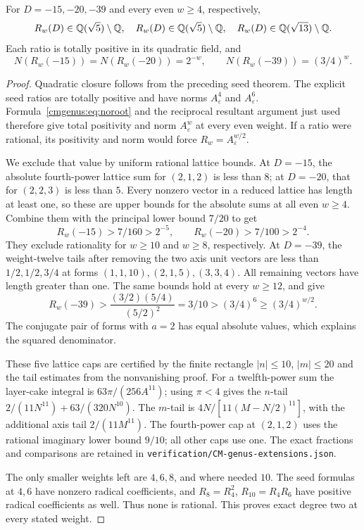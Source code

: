 \begin{theorem}
\label{cmextend:thm:exactdegree}
For $D=-15,-20,-39$ and every even $w\ge4$, respectively,
\[
 R_w(D)\in\mathbb{Q}(\sqrt5)\setminus\mathbb{Q},\quad
 R_w(D)\in\mathbb{Q}(\sqrt5)\setminus\mathbb{Q},\quad
 R_w(D)\in\mathbb{Q}(\sqrt{13})\setminus\mathbb{Q}.
\]
Each ratio is totally positive in its quadratic field, and
\[
 N(R_w(-15))=N(R_w(-20))=2^{-w},\qquad
 N(R_w(-39))=(3/4)^w.
\]
\end{theorem}
\begin{proof}
Quadratic closure follows from the preceding seed theorem. The explicit
seed ratios are totally positive and have norms $A_\varepsilon^4$ and
$A_\varepsilon^6$. Formula~\eqref{cmgenus:eq:noroot} and the reciprocal
resultant argument just used therefore give total positivity and norm
$A_\varepsilon^w$ at every even weight. If a ratio were rational, its
positivity and norm would force $R_w=A_\varepsilon^{w/2}$.

We exclude that value by uniform rational lattice bounds. At $D=-15$,
the absolute fourth-power lattice sum for $(2,1,2)$ is less than $8$;
at $D=-20$, that for $(2,2,3)$ is less than $5$. Every nonzero vector in
a reduced lattice has length at least one, so these are upper bounds for
the absolute sums at all even $w\ge4$. Combine them with the principal
lower bound $7/20$ to get
\[
 R_w(-15)>7/160>2^{-5},\qquad
 R_w(-20)>7/100>2^{-4}.
\]
They exclude rationality for $w\ge10$ and $w\ge8$, respectively.
At $D=-39$, the weight-twelve tails after removing the two axis unit
vectors are less than $1/2,1/2,3/4$ at forms $(1,1,10),(2,1,5),(3,3,4)$.
All remaining vectors have length greater than one. The same bounds hold
at every $w\ge12$, and give
\[
 R_w(-39)>\frac{(3/2)(5/4)}{(5/2)^2}=3/10
                  >(3/4)^6\ge(3/4)^{w/2}.
\]
The conjugate pair of forms with $a=2$ has equal absolute values, which
explains the squared denominator.

These five lattice caps are certified by the finite rectangle
$|n|\le10$, $|m|\le20$ and the tail estimates from the nonvanishing proof.
For a twelfth-power sum the layer-cake integral is
$63\pi/(256A^{11})$; using $\pi<4$ gives the $n$-tail
$2/(11N^{11})+63/(320N^{10})$. The $m$-tail is
$4N/[11(M-N/2)^{11}]$, with the additional axis tail
$2/(11M^{11})$. The fourth-power cap at $(2,1,2)$ uses the rational
imaginary lower bound $9/10$; all other caps use one. The exact fractions
and comparisons are retained in \texttt{verification/CM-genus-extensions.json}.

The only smaller weights left are $4,6,8$, and where needed $10$.
The seed formulas at $4,6$ have nonzero radical coefficients, and
$R_8=R_4^2$, $R_{10}=R_4R_6$ have positive radical coefficients as well.
Thus none is rational. This proves exact degree two at every stated weight.
\end{proof}

